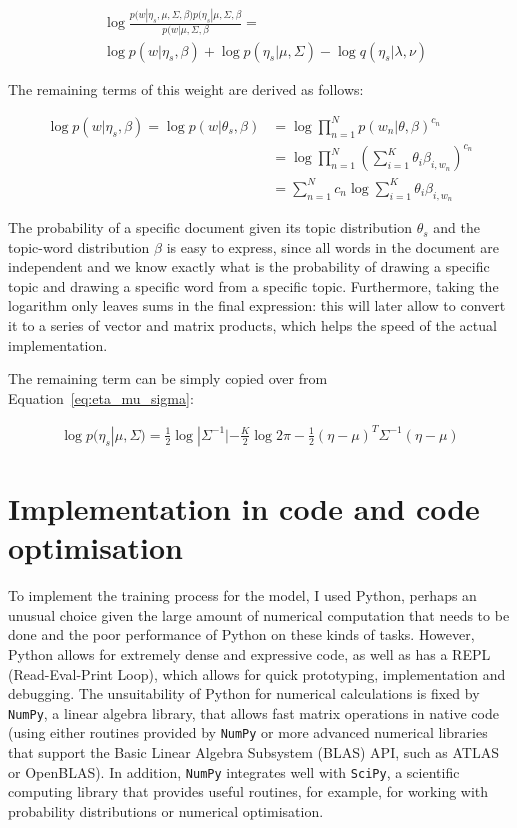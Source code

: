 \documentclass[12pt,a4paper,twoside,openright]{report}
\begin{document}
\begin{align}
&\log \frac{p(w | \eta_s, \mu, \Sigma, \beta)p(\eta_s | \mu, \Sigma, \beta}{p(w | \mu, \Sigma, \beta} = \\
&\log p(w | \eta_s, \beta) + \log p(\eta_s | \mu, \Sigma) - \log q(\eta_s | \lambda, \nu)
\end{align}

The remaining terms of this weight are derived as follows:

\begin{align}
\log p(w | \eta_s, \beta) = \log p(w | \theta_s, \beta) &= \log \prod\limits_{n=1}^N p(w_n | \theta, \beta)^{c_n}\\
&= \log \prod\limits_{n=1}^N (\sum\limits_{i=1}^K \theta_i \beta_{i, w_n})^{c_n}\\
&= \sum\limits_{n=1}^N c_n \log \sum\limits_{i=1}^K \theta_i \beta_{i, w_n}
\end{align}

The probability of a specific document given its topic distribution $\theta_s$ and the topic-word distribution $\beta$ is easy to express, since all words in the document are independent and we know exactly what is the probability of drawing a specific topic and drawing a specific word from a specific topic. Furthermore, taking the logarithm only leaves sums in the final expression: this will later allow to convert it to a series of vector and matrix products, which helps the speed of the actual implementation.

The remaining term can be simply copied over from Equation~\ref{eq:eta_mu_sigma}:

\begin{align}
\log p(\eta_s | \mu, \Sigma) = \frac{1}{2} \log |\Sigma^{-1}| - \frac{K}{2} \log 2 \pi - \frac{1}{2}(\eta - \mu)^T\Sigma^{-1}(\eta - \mu)
\end{align}

\section{Implementation in code and code optimisation}

To implement the training process for the model, I used Python, perhaps an unusual choice given the large amount of numerical computation that needs to be done and the poor performance of Python on these kinds of tasks. However, Python allows for extremely dense and expressive code, as well as has a REPL (Read-Eval-Print Loop), which allows for quick prototyping, implementation and debugging. The unsuitability of Python for numerical calculations is fixed by \texttt{NumPy}\cite{DBLP:journals/corr/abs-1102-1523}, a linear algebra library, that allows fast matrix operations in native code (using either routines provided by \texttt{NumPy} or more advanced numerical libraries that support the Basic Linear Algebra Subsystem (BLAS) API, such as ATLAS or OpenBLAS). In addition, \texttt{NumPy} integrates well with \texttt{SciPy}, a scientific computing library that provides useful routines, for example, for working with probability distributions or numerical optimisation.
\end{document}
